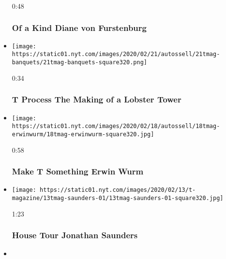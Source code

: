 \begin{itemize}
  0:48

  \hypertarget{of-a-kind--diane-von-furstenburg}{%
  \subsubsection{Of a Kind \textbar{} Diane von
  Furstenburg}\label{of-a-kind--diane-von-furstenburg}}
\item
  \href{https://www.nytimes.com/video/t-magazine/100000006981030/t-process-the-making-of-a-lobster-tower.html?action=click\&module=video-series-bar\&region=header\&pgtype=Article\&playlistId=video/t-magazine}{}

  \texttt{[image: https://static01.nyt.com/images/2020/02/21/autossell/21tmag-banquets/21tmag-banquets-square320.png]}

  0:34

  \hypertarget{t-process--the-making-of-a-lobster-tower}{%
  \subsubsection{T Process \textbar{} The Making of a Lobster
  Tower}\label{t-process--the-making-of-a-lobster-tower}}
\item
  \href{https://www.nytimes.com/video/t-magazine/100000006981365/make-t-something-erwin-wurm.html?action=click\&module=video-series-bar\&region=header\&pgtype=Article\&playlistId=video/t-magazine}{}

  \texttt{[image: https://static01.nyt.com/images/2020/02/18/autossell/18tmag-erwinwurm/18tmag-erwinwurm-square320.jpg]}

  0:58

  \hypertarget{make-t-something--erwin-wurm}{%
  \subsubsection{Make T Something \textbar{} Erwin
  Wurm}\label{make-t-something--erwin-wurm}}
\item
  \href{https://www.nytimes.com/video/t-magazine/design/100000006971957/house-tour-jonathan-saunders.html?action=click\&module=video-series-bar\&region=header\&pgtype=Article\&playlistId=video/t-magazine}{}

  \texttt{[image: https://static01.nyt.com/images/2020/02/13/t-magazine/13tmag-saunders-01/13tmag-saunders-01-square320.jpg]}

  1:23

  \hypertarget{house-tour--jonathan-saunders}{%
  \subsubsection{House Tour \textbar{} Jonathan
  Saunders}\label{house-tour--jonathan-saunders}}
\item
  \href{https://www.nytimes.com/video/t-magazine/100000006958934/silver-point-a-short-fashion-film-by-roe-ethridge.html?action=click\&module=video-series-bar\&region=header\&pgtype=Article\&playlistId=video/t-magazine}{}


\end{itemize}
